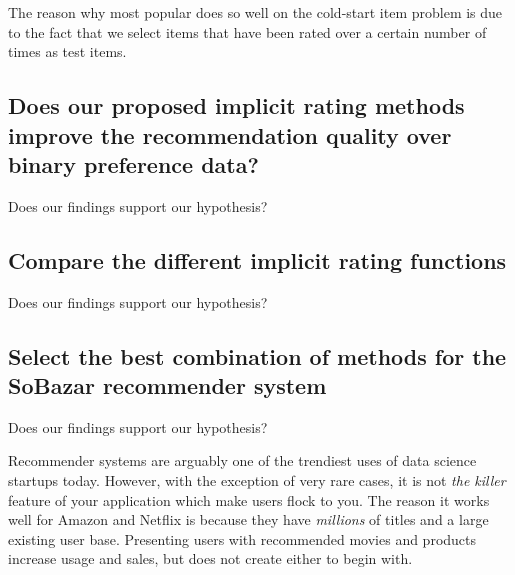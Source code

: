 The reason why most popular does so well on the cold-start item problem is due to the fact that we select items that have been rated over a certain number of times as test items.

















\subsection{Does our proposed implicit rating methods improve the recommendation quality over binary preference data?}

Does our findings support our hypothesis?



\subsection{Compare the different implicit rating functions}

Does our findings support our hypothesis?

\subsection{Select the best combination of methods for the SoBazar recommender system}

Does our findings support our hypothesis?












Recommender systems are arguably one of the trendiest uses of data science startups today. However, with the exception of very
rare cases, it is not \emph{the killer} feature of your application which make users flock to you. The reason it works
well for Amazon and Netflix is because they have \emph{millions} of titles and a large existing user base. Presenting users
with recommended movies and products increase usage and sales, but does not create either to begin with.


